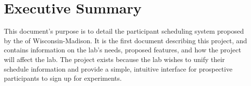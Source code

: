 \newcommand{\puttitle}{Milestone 1}


\section{Executive Summary}
This document's purpose is to detail the participant scheduling system proposed by the  of Wisconsin-Madison. It is the first document describing this project, and contains information on the lab's needs, proposed features, and how the project will affect the lab.  The project exists because the lab wishes to unify their schedule information and provide a simple, intuitive interface for prospective participants to sign up for experiments.








